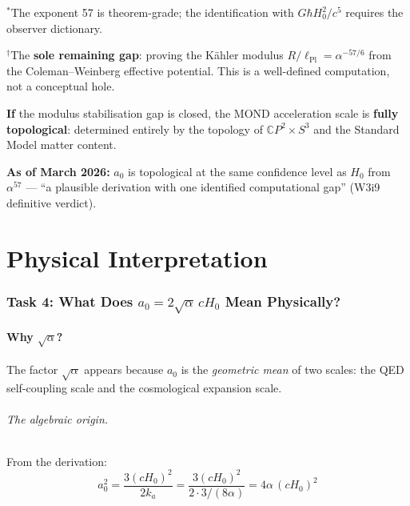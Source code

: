 \documentclass[12pt,a4paper]{article}
\newcommand{\CP}{\mathbb{C}P}
\newcommand{\Hzero}{H_0}
\begin{document}
${}^*$The exponent 57 is theorem-grade; the identification with
$G\hbar\Hzero^2/c^5$ requires the observer dictionary.

${}^\dagger$The \textbf{sole remaining gap}: proving the K\"ahler modulus
$R/\ell_{\mathrm{Pl}} = \alpha^{-57/6}$ from the Coleman--Weinberg effective
potential. This is a well-defined computation, not a conceptual hole.

\begin{tcolorbox}[colback=green!5!white, colframe=green!50!black,
  title=Assessment]
\textbf{If} the modulus stabilisation gap is closed, the MOND acceleration
scale is \textbf{fully topological}: determined entirely by the topology of
$\CP^2 \times S^3$ and the Standard Model matter content.

\textbf{As of March 2026:} $a_0$ is topological at the same confidence level
as $\Hzero$ from $\alpha^{57}$ --- ``a plausible derivation with one
identified computational gap'' (W3i9 definitive verdict).
\end{tcolorbox}


\part{Physical Interpretation}


\section{Task 4: What Does $a_0 = 2\sqrt{\alpha}\,c\Hzero$ Mean Physically?}
\label{sec:physical}

\subsection{Why $\sqrt{\alpha}$?}
\label{sec:why-sqrt-alpha}

The factor $\sqrt{\alpha}$ appears because $a_0$ is the \emph{geometric mean}
of two scales: the QED self-coupling scale and the cosmological expansion
scale.

\paragraph{The algebraic origin.}
From the derivation:
\begin{equation}
a_0^2 = \frac{3(c\Hzero)^2}{2k_a}
= \frac{3(c\Hzero)^2}{2 \cdot 3/(8\alpha)}
= 4\alpha\,(c\Hzero)^2
\end{equation}
\end{document}
